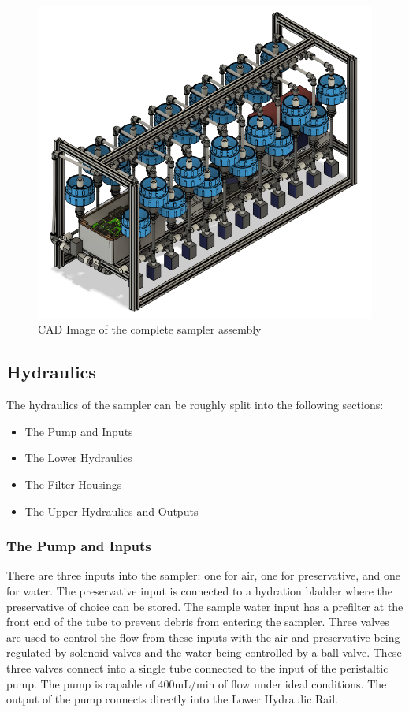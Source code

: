 \documentclass[11pt, letterpaper]{article}
\begin{document}
\begin{figure}[H]
	\centering
	\includegraphics[scale=0.5]{./Assets/Sampler CAD.png} %
	\caption{CAD Image of the complete sampler assembly}
\end{figure}

\subsection{Hydraulics}
\label{subsec:Hydr}
The hydraulics of the sampler can be roughly split into the following sections:
\begin{itemize}	%
	\item The Pump and Inputs
	\item The Lower Hydraulics
	\item The Filter Housings
	\item The Upper Hydraulics and Outputs
\end{itemize}

\subsubsection{The Pump and Inputs}
There are three inputs into the sampler: one for air, one for preservative, and one for water. The preservative input is connected to a hydration bladder where the preservative of choice can be stored. The sample water input has a prefilter at the front end of the tube to prevent debris from entering the sampler. Three valves are used to control the flow from these inputs with the air and preservative being regulated by solenoid valves and the water being controlled by a ball valve. These three valves connect into a single tube connected to the input of the peristaltic pump. The pump is capable of 400mL/min of flow under ideal conditions. The output of the pump connects directly into the Lower Hydraulic Rail. 
\end{document}
